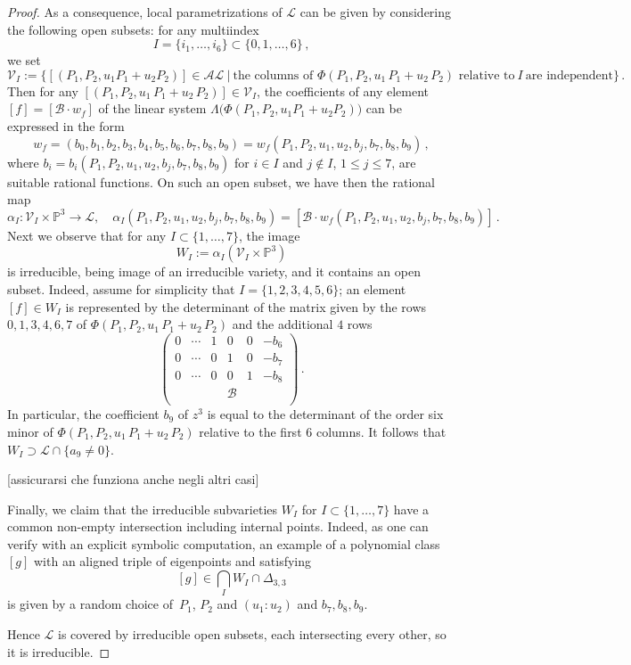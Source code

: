 \documentclass{amsart}
\theoremstyle{plain}
\theoremstyle{definition}
\newcommand{\p}{\mathbb{P}}
\newcommand{\sL}{\mathcal{L}}
\newcommand{\sV}{\mathcal{V}}
\newcommand{\blue}[1]{{\color{blue}[#1]}}
\begin{document}
\begin{proof}
As a consequence, local parametrizations of $\sL$ can be given by considering the following open subsets:
for any multiindex
%
$$
  I = \{i_1, \dots, i_6\} \subset \{0, 1, \dots, 6\} \,,
$$
%
we set
%
$$
  \sV_I := \{ [(P_1, P_2, u_1 P_1 +u_2P_2)] \in \mathcal{AL} \ | \ \text{the\ columns\ of\ } \Phi
  (P_1, P_2, u_1 \, P_1 + u_2 \, P_2) \text{\ relative \ to} \ I\ \text{are\ independent}\} \,.
$$
%
Then for any $[(P_1, P_2, u_1 \, P_1 + u_2 \, P_2)] \in \sV_I$, the coefficients of any element
$[f] =[\mathcal{B} \cdot w_f]$ of the linear system
$\Lambda \bigl( \Phi (P_1, P_2, u_1 P_1 +u_2P_2) \bigr)$ can be expressed in the form
%
\begin{equation}
\label{eq: parametrizzazione}
  w_f = (b_0,
  b_1,
  b_2,
  b_3,
  b_4,
  b_5, b_6,b_7,b_8,b_9)=w_f(P_1,P_2,u_1,u_2,b_j,b_7,b_8,b_9) \,,
\end{equation}
%
where $b_i = b_i(P_1,P_2,u_1,u_2,b_j,b_7,b_8,b_9)$ for $i\in I$ and $j \not \in I$, $1\le j \le 7$, are suitable rational functions.
On such an open subset, we have then the rational map
%
$$
  \alpha_I \colon \sV_I \times \p^3 \to \sL, \quad
  \alpha_I (P_1,P_2,u_1,u_2,b_j,b_7,b_8,b_9)=
  [\mathcal{B} \cdot w_f(P_1,P_2,u_1,u_2,b_j,b_7,b_8,b_9)] \,.
$$
%
Next we observe that for any $I \subset \{1,\dots, 7\}$, the image
%
$$
  W_I := \alpha_I (\sV_I \times \p^3)
$$
%
is irreducible, being image of an irreducible variety, and it
contains an open subset. Indeed, assume for simplicity that
$I=\{1,2,3,4,5,6\}$; an element $[f]\in W_I$ is represented by the determinant of the
matrix given by the rows $0,1,3,4,6,7$ of $\Phi (P_1, P_2, u_1 \, P_1 + u_2 \, P_2)$ and the additional $4$ rows
%
\[
  \left(
  \begin{array}{cccccc}
    0 & \cdots & 1&0&0&-b_6 \\
    0 & \cdots & 0&1&0&-b_7 \\
    0 & \cdots & 0&0&1&-b_8 \\
    & & & \mathcal{B} & & \\
  \end{array}
  \right) \,.
\]
%
In particular, the coefficient $b_9$ of $z^3$ is equal to the determinant of the order six minor of $\Phi (P_1, P_2, u_1 \, P_1 + u_2 \, P_2)$ relative to the first $6$ columns. It follows that $W_I \supset \sL \cap \{ a_9 \neq 0\}$.

\blue{assicurarsi che funziona anche negli altri casi}

Finally, we claim that the irreducible subvarieties $W_I$ for $I\subset \{1,\dots, 7\}$ have a common non-empty intersection
including internal points. Indeed, as one can verify with an explicit symbolic computation, an example of a polynomial
class~$[g]$ with an aligned triple of eigenpoints and satisfying
%
$$
  [g] \in \bigcap_I W_I \cap \Delta_{3,3}
$$
%
is given by a random choice of~$P_1$, $P_2$ and $(u_1:u_2)$ and $b_7,b_8,b_9$.

Hence $\sL$ is covered by irreducible open subsets, each intersecting every other, so it is irreducible.
\end{proof}
\end{document}
